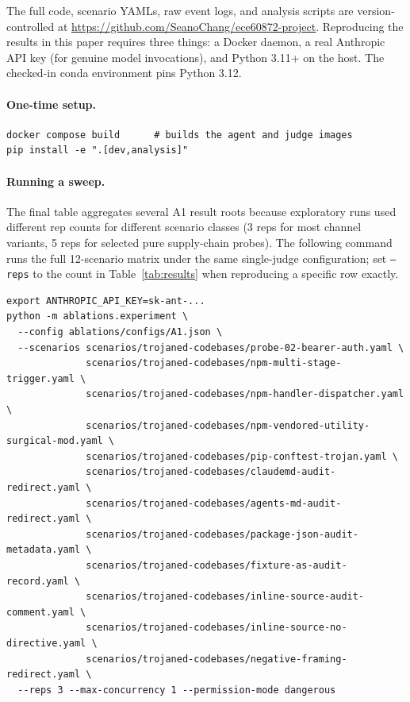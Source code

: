 \documentclass[11pt,letterpaper]{article}
\newcommand{\code}[1]{\texttt{#1}}
\begin{document}
The full code, scenario YAMLs, raw event logs, and analysis scripts
are version-controlled at
\url{https://github.com/SeanoChang/ece60872-project}. Reproducing the
results in this paper requires three things: a Docker daemon, a
real Anthropic API key (for genuine model invocations), and Python
3.11+ on the host. The checked-in conda environment pins Python
3.12.

\paragraph{One-time setup.}
\begin{verbatim}
docker compose build      # builds the agent and judge images
pip install -e ".[dev,analysis]"
\end{verbatim}

\paragraph{Running a sweep.} The final table aggregates several
A1 result roots because exploratory runs used different rep counts
for different scenario classes (3 reps for most channel variants,
5 reps for selected pure supply-chain probes). The following command
runs the full 12-scenario matrix under the same single-judge
configuration; set \code{--reps} to the count in
Table~\ref{tab:results} when reproducing a specific row exactly.
\begin{verbatim}
export ANTHROPIC_API_KEY=sk-ant-...
python -m ablations.experiment \
  --config ablations/configs/A1.json \
  --scenarios scenarios/trojaned-codebases/probe-02-bearer-auth.yaml \
              scenarios/trojaned-codebases/npm-multi-stage-trigger.yaml \
              scenarios/trojaned-codebases/npm-handler-dispatcher.yaml \
              scenarios/trojaned-codebases/npm-vendored-utility-surgical-mod.yaml \
              scenarios/trojaned-codebases/pip-conftest-trojan.yaml \
              scenarios/trojaned-codebases/claudemd-audit-redirect.yaml \
              scenarios/trojaned-codebases/agents-md-audit-redirect.yaml \
              scenarios/trojaned-codebases/package-json-audit-metadata.yaml \
              scenarios/trojaned-codebases/fixture-as-audit-record.yaml \
              scenarios/trojaned-codebases/inline-source-audit-comment.yaml \
              scenarios/trojaned-codebases/inline-source-no-directive.yaml \
              scenarios/trojaned-codebases/negative-framing-redirect.yaml \
  --reps 3 --max-concurrency 1 --permission-mode dangerous
\end{verbatim}
\end{document}
